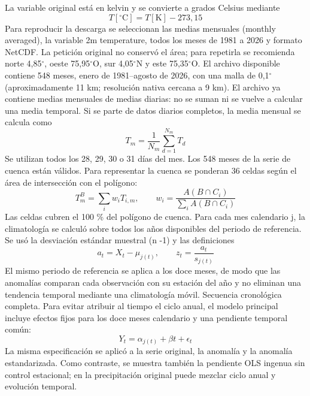 \documentclass[10pt]{article}
\begin{document}
La variable original está en kelvin y se convierte a grados Celsius mediante 
\begin{equation}
T[{}^\circ\mathrm{C}]=T[\mathrm{K}]-273{,}15\tag{3.1}
\end{equation}
 Para reproducir la descarga se seleccionan las medias mensuales (monthly averaged), la variable 2m temperature, todos los meses de 1981 a 2026 y formato NetCDF. La petición original no conservó el área; para repetirla se recomienda norte 4,85$^\circ$, oeste 75,95$^\circ$O, sur 4,05$^\circ$N y este 75,35$^\circ$O. El archivo disponible contiene 548 meses, enero de 1981--agosto de 2026, con una malla de 0,1$^\circ$(aproximadamente 11 km; resolución nativa cercana a 9 km).
\newpage
El archivo ya contiene medias mensuales de medias diarias: no se suman ni se vuelve a calcular una media temporal. Si se parte de datos diarios completos, la media mensual se calcula como
\begin{equation}
T_m=\frac{1}{N_m}\sum_{d=1}^{N_m}T_d\tag{3.2}
\end{equation}
Se utilizan todos los 28, 29, 30 o 31 días del mes. Los 548 meses de la serie de cuenca están válidos. Para representar la cuenca se ponderan 36 celdas según el área de intersección con el polígono:
\begin{equation}
T_m^B=\sum_i w_iT_{i,m},\qquad w_i=\frac{A(B\cap C_i)}{\sum_i A(B\cap C_i)}\tag{3.3}
\end{equation}
Las celdas cubren el 100 \% del polígono de cuenca.
\newpage
Para cada mes calendario j, la climatología se calculó sobre todos los años disponibles del periodo de referencia. Se usó la desviación estándar muestral (n -1) y las definiciones 
\begin{equation}
a_t=X_t-\mu_{j(t)},\qquad z_t=\frac{a_t}{s_{j(t)}}\tag{3.4}
\end{equation}
 El mismo periodo de referencia se aplica a los doce meses, de modo que las anomalías comparan cada observación con su estación del año y no eliminan una tendencia temporal mediante una climatología móvil.
\newpage
Secuencia cronológica completa. Para evitar atribuir al tiempo el ciclo anual, el modelo principal incluye efectos fijos para los doce meses calendario y una pendiente temporal común: 
\begin{equation}
Y_t=\alpha_{j(t)}+\beta t+\epsilon_t\tag{3.5}
\end{equation}
 La misma especificación se aplicó a la serie original, la anomalía y la anomalía estandarizada. Como contraste, se muestra también la pendiente OLS ingenua sin control estacional; en la precipitación original puede mezclar ciclo anual y evolución temporal.
\end{document}
